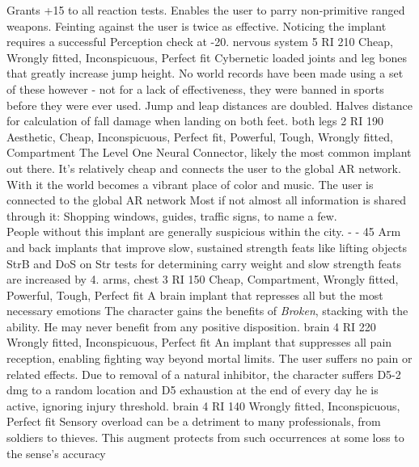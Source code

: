 \begin{multicols}{2}
    {Grants +15 to all reaction tests. Enables the user to parry non-primitive ranged weapons.
	   Feinting against the user is twice as effective.
       Noticing the implant requires a successful Perception check at -20.}
    {nervous system}
    {5 RI}
    {210}
    {Cheap, Wrongly fitted, Inconspicuous, Perfect fit}
    {Cybernetic loaded joints and leg bones that greatly increase jump height. No world records have been made using a set of these however - not for a lack of effectiveness, they were banned in sports before they were ever used.}
    {Jump and leap distances are doubled. Halves distance for calculation of fall damage when landing on both feet.}
    {both legs}
    {2 RI}
    {190}
    {Aesthetic, Cheap, Inconspicuous, Perfect fit, Powerful, Tough, Wrongly fitted, Compartment}
	{
		\label{implant:l1nc}
	The Level One Neural Connector, likely the most common implant out there.
	It's relatively cheap and connects the user to the global AR network.
	With it the world becomes a vibrant place of color and music.}
	{The user is connected to the global AR network
	Most if not almost all information is shared through it:
	Shopping windows,
		guides,
		traffic signs,
		to name a few.
	\\%
	People without this implant are generally suspicious within the city.
	}
	{-}
	{-}
	{45}
	{}
    {Arm and back implants that improve slow, sustained strength feats like lifting objects}
    {StrB and DoS on Str tests for determining carry weight and slow strength feats are increased by 4.}
    {arms, chest}
    {3 RI}
    {150}
    {Cheap, Compartment, Wrongly fitted, Powerful, Tough, Perfect fit}
    {A brain implant that represses all but the most necessary emotions}
    {The character gains the benefits of \emph{Broken}, stacking with the ability. He may never benefit from any positive disposition.}
    {brain}
    {4 RI}
    {220}
    {Wrongly fitted, Inconspicuous, Perfect fit}
    {An implant that suppresses all pain reception, enabling fighting way beyond mortal limits.}
    {The user suffers no pain or related effects.
	   Due to removal of a natural inhibitor, the character suffers D5-2 dmg to a random location and D5 exhaustion at the end of every day he is active, ignoring injury threshold.}
    {brain}
    {4 RI}
    {140}
    {Wrongly fitted, Inconspicuous, Perfect fit}
    {Sensory overload can be a detriment to many professionals, from soldiers to thieves. This augment protects from such occurrences at some loss to the sense's accuracy}

\end{multicols}
